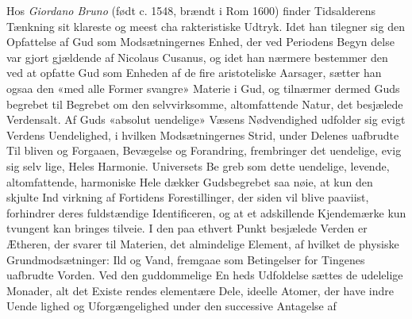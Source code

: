 \documentclass[12pt,a4paper]{book}
\begin{document}
Hos \emph{Giordano Bruno} (født c. 1548, brændt i Rom
1600) finder Tidsalderens Tænkning sit klareste og meest cha\-%
rakteristiske Udtryk. Idet han tilegner sig den Opfattelse af
Gud som Modsætningernes Enhed, der ved Periodens Begyn\-%
delse var gjort gjældende af Nicolaus Cusanus, og idet han
nærmere bestemmer den ved at opfatte Gud som Enheden af
de fire aristoteliske Aarsager, sætter han ogsaa den «med alle
Former svangre» Materie i Gud, og tilnærmer dermed Guds\-%
begrebet til Begrebet om den selvvirksomme, altomfattende
Natur, det besjælede Verdensalt. Af Guds «absolut uendelige»
Væsens Nødvendighed udfolder sig evigt Verdens Uendelighed,
i hvilken Modsætningernes Strid, under Delenes uafbrudte Til\-%
bliven og Forgaaen, Bevægelse og Forandring, frembringer det
uendelige, evig sig selv lige, Heles Harmonie. Universets Be\-%
greb som dette uendelige, levende, altomfattende, harmoniske
Hele dækker Gudsbegrebet saa nøie, at kun den skjulte Ind\-%
virkning af Fortidens Forestillinger, der siden vil blive paaviist,
forhindrer deres fuldstændige Identificeren, og at et adskillende
Kjendemærke kun tvungent kan bringes tilveie. I den paa
ethvert Punkt besjælede Verden er Ætheren, der svarer til
Materien, det almindelige Element, af hvilket de physiske
Grundmodsætninger: Ild og Vand, fremgaae som Betingelser
for Tingenes uafbrudte Vorden. Ved den guddommelige En\-%
heds Udfoldelse sættes de udelelige Monader, alt det Existe\-%
rendes elementære Dele, ideelle Atomer, der have indre Uende\-%
lighed og Uforgængelighed under den successive Antagelse af
\end{document}
